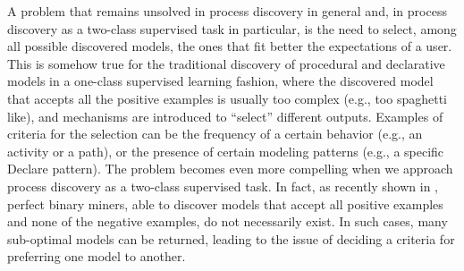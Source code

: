 A problem that remains unsolved in process discovery in general and, in process discovery as a two-class supervised task in particular, is the need to select, among all possible discovered models, the ones that fit better the expectations of a user. This is somehow true for the traditional discovery of procedural and declarative models in a one-class supervised learning fashion, where the discovered model that accepts all the positive examples is usually too complex (e.g., too spaghetti like), and mechanisms are introduced to ``select'' different outputs. Examples of criteria for the selection can be the frequency of a certain behavior (e.g., an activity or a path), or the presence of certain modeling patterns (e.g., a specific Declare pattern).   
The problem becomes even more compelling when we approach process discovery as a two-class supervised task. In fact, as recently shown in \cite{DBLP:conf/bpm/SlaatsDB21}, perfect binary miners, able to discover models that accept all positive examples and none of the negative examples, do not necessarily exist. In such cases, many sub-optimal models can be returned, leading to the issue of deciding a criteria for preferring one model to another.
 
